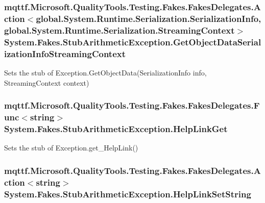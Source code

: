 \hypertarget{class_system_1_1_fakes_1_1_stub_arithmetic_exception_aaf209141f394b4d52b90ab39a9e5f713}{
\subsubsection[{Get\-Object\-Data\-Serialization\-Info\-Streaming\-Context}]{\setlength{\rightskip}{0pt plus 5cm}mqttf.\-Microsoft.\-Quality\-Tools.\-Testing.\-Fakes.\-Fakes\-Delegates.\-Action$<$global.\-System.\-Runtime.\-Serialization.\-Serialization\-Info, global.\-System.\-Runtime.\-Serialization.\-Streaming\-Context$>$ System.\-Fakes.\-Stub\-Arithmetic\-Exception.\-Get\-Object\-Data\-Serialization\-Info\-Streaming\-Context}}\label{class_system_1_1_fakes_1_1_stub_arithmetic_exception_aaf209141f394b4d52b90ab39a9e5f713}


Sets the stub of Exception.\-Get\-Object\-Data(\-Serialization\-Info info, Streaming\-Context context)

\hypertarget{class_system_1_1_fakes_1_1_stub_arithmetic_exception_a68e3cbfdd815d05d1c23f1b81292fdfd}{
\subsubsection[{Help\-Link\-Get}]{\setlength{\rightskip}{0pt plus 5cm}mqttf.\-Microsoft.\-Quality\-Tools.\-Testing.\-Fakes.\-Fakes\-Delegates.\-Func$<$string$>$ System.\-Fakes.\-Stub\-Arithmetic\-Exception.\-Help\-Link\-Get}}\label{class_system_1_1_fakes_1_1_stub_arithmetic_exception_a68e3cbfdd815d05d1c23f1b81292fdfd}


Sets the stub of Exception.\-get\-\_\-\-Help\-Link()

\hypertarget{class_system_1_1_fakes_1_1_stub_arithmetic_exception_af84c5a3b1d3916ad486e260b2a68b3e3}{
\subsubsection[{Help\-Link\-Set\-String}]{\setlength{\rightskip}{0pt plus 5cm}mqttf.\-Microsoft.\-Quality\-Tools.\-Testing.\-Fakes.\-Fakes\-Delegates.\-Action$<$string$>$ System.\-Fakes.\-Stub\-Arithmetic\-Exception.\-Help\-Link\-Set\-String}}\label{class_system_1_1_fakes_1_1_stub_arithmetic_exception_af84c5a3b1d3916ad486e260b2a68b3e3}


